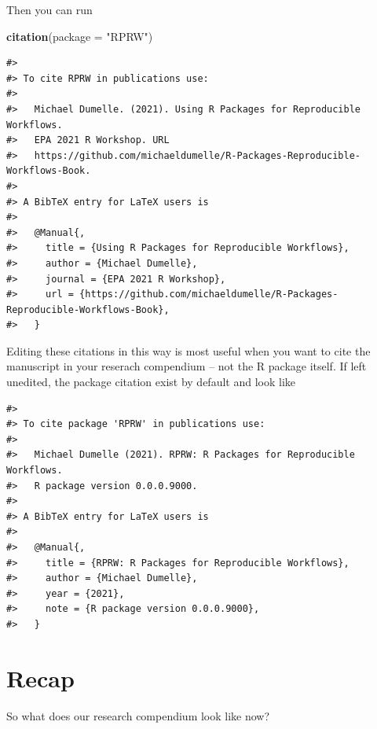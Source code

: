\documentclass[
]{book}
\newenvironment{Shaded}{\begin{snugshade}}{\end{snugshade}}
\newcommand{\DataTypeTok}[1]{\textcolor[rgb]{0.13,0.29,0.53}{#1}}
\newcommand{\KeywordTok}[1]{\textcolor[rgb]{0.13,0.29,0.53}{\textbf{#1}}}
\newcommand{\NormalTok}[1]{#1}
\newcommand{\StringTok}[1]{\textcolor[rgb]{0.31,0.60,0.02}{#1}}
\begin{document}
Then you can run

\begin{Shaded}
\begin{Highlighting}[]
\KeywordTok{citation}\NormalTok{(}\DataTypeTok{package =} \StringTok{"RPRW"}\NormalTok{)}
\end{Highlighting}
\end{Shaded}

\begin{verbatim}
#> 
#> To cite RPRW in publications use:
#> 
#>   Michael Dumelle. (2021). Using R Packages for Reproducible Workflows.
#>   EPA 2021 R Workshop. URL
#>   https://github.com/michaeldumelle/R-Packages-Reproducible-Workflows-Book.
#> 
#> A BibTeX entry for LaTeX users is
#> 
#>   @Manual{,
#>     title = {Using R Packages for Reproducible Workflows},
#>     author = {Michael Dumelle},
#>     journal = {EPA 2021 R Workshop},
#>     url = {https://github.com/michaeldumelle/R-Packages-Reproducible-Workflows-Book},
#>   }
\end{verbatim}

Editing these citations in this way is most useful when you want to cite the manuscript in your reserach compendium -- not the R package itself. If left unedited, the package citation exist by default and look like

\begin{verbatim}
#> 
#> To cite package 'RPRW' in publications use:
#> 
#>   Michael Dumelle (2021). RPRW: R Packages for Reproducible Workflows.
#>   R package version 0.0.0.9000.
#> 
#> A BibTeX entry for LaTeX users is
#> 
#>   @Manual{,
#>     title = {RPRW: R Packages for Reproducible Workflows},
#>     author = {Michael Dumelle},
#>     year = {2021},
#>     note = {R package version 0.0.0.9000},
#>   }
\end{verbatim}

\hypertarget{recap}{%
\section{Recap}\label{recap}}

So what does our research compendium look like now?
\end{document}
